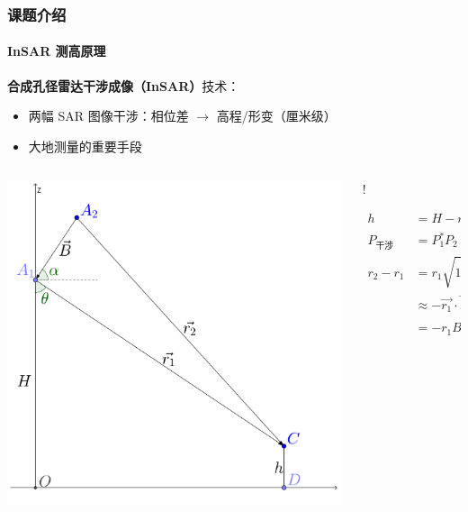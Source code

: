 \documentclass{beamer}
\begin{document}
\begin{frame}
    \frametitle{课题介绍}
    \framesubtitle{InSAR 测高原理}

    \textbf{合成孔径雷达干涉成像（InSAR）}技术：
    \begin{itemize}
        \small
        \setlength\itemsep{-0.1em}
        \item 两幅 SAR 图像干涉：相位差 $\to$ 高程/形变（厘米级）
        \item 大地测量的重要手段
    \end{itemize}
 
    \begin{columns}
        \begin{column}{0.5\textwidth}
            \centering
            \includegraphics[width=0.99\textwidth]{figures/insar_simple.pdf}
        \end{column}
        \begin{column}{0.5\textwidth}
            \footnotesize
             {!} {
                \begin{minipage}{\linewidth}
                \begin{align*}
                    h &= H - r_1 \cos\theta \\
                    P_{\textrm{干涉}} &= P_1^* P_2 =  A_1 A_2 \exp(i \frac{4\pi}{\lambda}(r_2 - r_1)) \\
                    r_2 - r_1 &= r_1 \sqrt{1- \frac{\vec{r_1} \cdot \vec{B}}{r_1} + (\frac{B}{r_1})^2} \\
                              &\approx - \vec{r_1} \cdot \vec{B} \qquad \because B \ll |\vec{r}| \\
                              &= - r_1 B \cos(\frac{\pi}{2} - \theta + \alpha)
                \end{align*}
                \end{minipage}
            }


\end{column}
\end{columns}
\end{frame}
\end{document}
